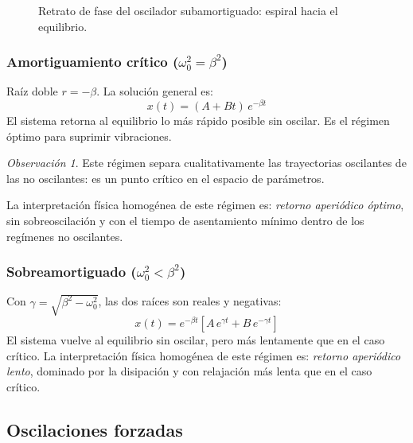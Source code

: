 \documentclass[12pt, a4paper]{article}
\theoremstyle{plain}
\theoremstyle{definition}
\theoremstyle{remark}
\newtheorem*{observacion}{Observación}
\begin{document}
\begin{figure}[H]
  \centering
  \caption{Retrato de fase del oscilador subamortiguado: espiral hacia el equilibrio.}
\end{figure}

\subsubsection{Amortiguamiento crítico \texorpdfstring{($\omega_0^2 = \beta^2$)}{}}

Raíz doble $r = -\beta$. La solución general es:
\begin{equation}
  x(t) = (A + Bt)\,e^{-\beta t}
\end{equation}
El sistema retorna al equilibrio lo más rápido posible sin oscilar. Es el régimen óptimo
para suprimir vibraciones.
\begin{observacion}
Este régimen separa cualitativamente las trayectorias oscilantes de las no oscilantes:
es un punto crítico en el espacio de parámetros.
\end{observacion}
La interpretación física homogénea de este régimen es: \emph{retorno aperiódico óptimo},
sin sobreoscilación y con el tiempo de asentamiento mínimo dentro de los regímenes no
oscilantes.

\subsubsection{Sobreamortiguado \texorpdfstring{($\omega_0^2 < \beta^2$)}{}}

Con $\gamma = \sqrt{\beta^2 - \omega_0^2}$, las dos raíces son reales y negativas:
\begin{equation}
  x(t) = e^{-\beta t}\!\left[A\,e^{\gamma t} + B\,e^{-\gamma t}\right]
\end{equation}
El sistema vuelve al equilibrio sin oscilar, pero más lentamente que en el caso crítico.
La interpretación física homogénea de este régimen es: \emph{retorno aperiódico lento},
dominado por la disipación y con relajación más lenta que en el caso crítico.

\subsection{Oscilaciones forzadas}
\end{document}
